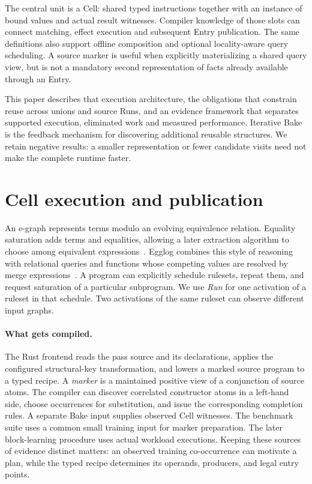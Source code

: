 \documentclass[10pt,letterpaper]{article}
\begin{document}
The central unit is a Cell: shared typed instructions together with an instance
of bound values and actual result witnesses. Compiler knowledge of those slots
can connect matching, effect execution and subsequent Entry publication. The
same definitions also support offline composition and optional locality-aware
query scheduling. A source marker is useful when explicitly materializing a
shared query view, but is not a mandatory second representation of facts already
available through an Entry.

This paper describes that execution architecture, the obligations that constrain
reuse across unions and source Runs, and an evidence framework that separates
supported execution, eliminated work and measured performance. Iterative Bake
is the feedback mechanism for discovering additional reusable structures. We
retain negative results: a smaller representation or fewer candidate visits
need not make the complete runtime faster.



\section{Cell execution and publication}
An e-graph represents terms modulo an evolving equivalence relation. Equality saturation adds terms and equalities, allowing a later extraction algorithm to choose among equivalent expressions~\cite{tate,egg}. Egglog combines this style of reasoning with relational queries and functions whose competing values are resolved by merge expressions~\cite{egglog}. A program can explicitly schedule rulesets, repeat them, and request saturation of a particular subprogram. We use \emph{Run} for one activation of a ruleset in that schedule. Two activations of the same ruleset can observe different input graphs.

\paragraph{What gets compiled.}
The Rust frontend reads the pass source and its declarations, applies the configured structural-key transformation, and lowers a marked source program to a typed recipe. A \emph{marker} is a maintained positive view of a conjunction of source atoms. The compiler can discover correlated constructor atoms in a left-hand side, choose occurrences for substitution, and issue the corresponding completion rules. A separate Bake input supplies observed Cell witnesses. The benchmark suite uses a common small training input for marker preparation. The later block-learning procedure uses actual workload executions. Keeping these sources of evidence distinct matters: an observed training co-occurrence can motivate a plan, while the typed recipe determines its operands, producers, and legal entry points.
\end{document}
